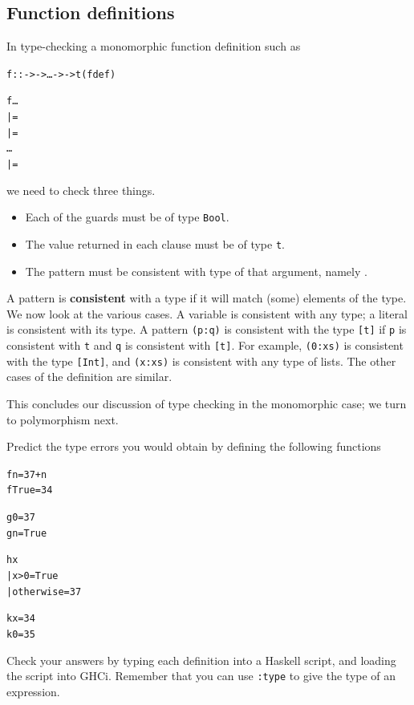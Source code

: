 \subsection*{Function definitions}

In type-checking a monomorphic function definition such as 
\begin{alltt}
f ::  ->  -> \ldots  ->  -> t\hfill(fdef)

f   \ldots {}
  |      = 
  |      = 
  \ldots
  |      = 
\end{alltt}
\label{fdef}
we need to check three
things.
\begin{itemize}
\item Each of the guards  must be of type \texttt{Bool}.
\item The value  returned in each clause must be of type \texttt{t}.
\item The pattern  must be consistent with type
of that argument, namely . 
\end{itemize}
A pattern is \textbf{consistent} with a type if it will match (some) elements of
the type. We now look at the various cases.
A variable is consistent with
any type; a literal is consistent with its type. A pattern \texttt{(p:q)} is consistent with the type
\texttt{[t]} if \texttt{p} is consistent with \texttt{t} and
\texttt{q} is consistent with \texttt{[t]}. For example, \texttt{(0:xs)} is consistent with
the type \texttt{[Int]}, and \texttt{(x:xs)} is consistent with any type
of lists.
The other cases of the
definition are similar. 

This concludes our discussion of type checking in the monomorphic case;
we turn to polymorphism next.


\begin{exerciseone}
\item
Predict the type errors you would obtain by defining the following functions
\begin{alltt}
f n     = 37+n
f True  = 34

g 0 = 37
g n = True

h x 
  | x>0         = True
  | otherwise   = 37

k x = 34
k 0 = 35
\end{alltt}
Check your answers by typing each definition into a Haskell script, and
loading the script into GHCi. Remember that you can use \texttt{:type}
to give the type of an expression.
\end{exerciseone}

